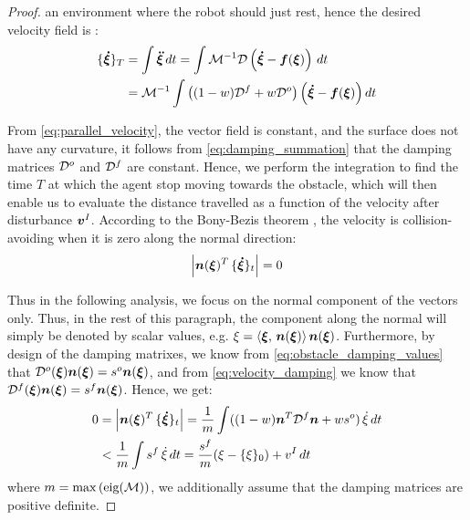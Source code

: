 \begin{proof}

an environment where the robot should just rest, hence the desired velocity field is :
\begin{equation}
\begin{split}
	\{ \vecs{\dot \xi} \}_{T} 
	& = \int \vecs{\ddot \xi} \, dt = \int \matd{M}^{-1} \matd{D} \left( \vecs{\dot \xi} - \vect f(\vecs \xi ) \right) \, dt \\
	& = \matd{M}^{-1} \int \left( (1 - w) \matd{D}^f + w \matd{D}^{o} \right) \left( \vecs{\dot \xi} - \vect f (\vecs \xi ) \right) dt \\
	\end{split}
\label{eq:velocity_evolution}
\end{equation}

From \eqref{eq:parallel_velocity}, the vector field is constant, and the surface does not have any curvature, it follows from \eqref{eq:damping_summation} that the damping matrices $\mathcal{D}^o$ and $\mathcal{D}^f$ are constant. 
Hence, we perform the integration to find the time $T$ at which the agent stop moving towards the obstacle, which will then enable us to evaluate the distance travelled as a function of the velocity after disturbance $\boldsymbol{v}^I$. According to the Bony-Bezis theorem \parencite{bony1969principe}, the velocity is collision-avoiding when it is zero along the normal direction:
\begin{equation}
	\left| \boldsymbol{n}(\boldsymbol{\xi})^T \, \{ \boldsymbol{\dot \xi} \}_{t} \right| = 0
\end{equation}

Thus in the following analysis, we focus on the normal component of the vectors only. Thus, in the rest of this paragraph, the component along the normal will simply be denoted by scalar values, e.g. $\xi = \left\langle {\boldsymbol{\xi}}, \, {\boldsymbol{n}(\boldsymbol{\xi})} \right\rangle \boldsymbol{n}(\boldsymbol{\xi})$.
	Furthermore, by design of the damping matrixes, we know from \eqref{eq:obstacle_damping_values} 
	that $\mathcal{D}^o(\boldsymbol{\xi}) \boldsymbol{n}(\boldsymbol{\xi}) = s^o \boldsymbol{n}(\boldsymbol{\xi})$, and from \eqref{eq:velocity_damping} we know that $\mathcal{D}^f(\boldsymbol{\xi}) \boldsymbol{n}(\boldsymbol{\xi}) = s^f \boldsymbol{n}(\boldsymbol{\xi})$. Hence, we get:
\begin{align}
	0 & = \left| \boldsymbol{n}(\boldsymbol{\xi})^T \, \{ \boldsymbol{\dot \xi} \}_{t} \right| 
	  = \frac 1 m \int ( (1-w) \boldsymbol{n}^T \mathcal{D}^f \boldsymbol{n} + w s^{o} ) \, {\dot \xi} \, dt \nonumber \\
	   & < \frac 1 m \int  s^{f}  \, {\dot \xi} \, dt 
	   = \frac{s^f}{m} (\xi - \{ \xi \}_0 ) + v^I \, dt 
\end{align}
where $m = \max{\left(\text{eig}(\mathcal{M})\right)}$, we additionally assume that the damping matrices are positive definite. 


\end{proof}
